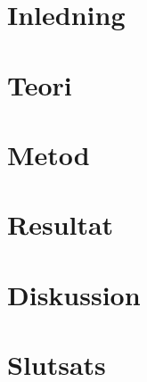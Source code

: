 \documentclass[12pt]{report}
\begin{document}

\pagestyle{nomcl}
\thispagestyle{empty}


{\renewcommand{\thispagestyle}[1]{}
\printnomenclature[2.5cm]
}
\blankpage



\pagestyle{main}
\setcounter{page}{1}

\chapter{Inledning} \label{chap:inledning}
\thispagestyle{empty}

\blankpage

\chapter{Teori} \label{chap:teori}
\thispagestyle{empty}

\blankpage

\chapter{Metod} \label{chap:metod}
\thispagestyle{empty}

\blankpage

\chapter{Resultat} \label{chap:resultat}
\thispagestyle{empty}

\blankpage

\chapter{Diskussion} \label{chap:diskussion} 
\thispagestyle{empty}

\blankpage

\chapter{Slutsats} \label{chap:slutsats} 
\thispagestyle{empty}

\blankpage
\end{document}
